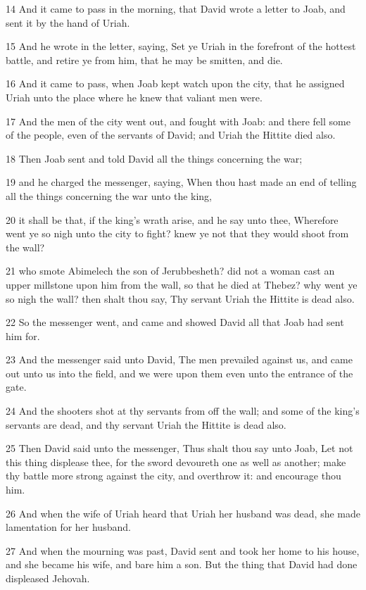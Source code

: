 \par 14 And it came to pass in the morning, that David wrote a letter to Joab, and sent it by the hand of Uriah.
\par 15 And he wrote in the letter, saying, Set ye Uriah in the forefront of the hottest battle, and retire ye from him, that he may be smitten, and die.
\par 16 And it came to pass, when Joab kept watch upon the city, that he assigned Uriah unto the place where he knew that valiant men were.
\par 17 And the men of the city went out, and fought with Joab: and there fell some of the people, even of the servants of David; and Uriah the Hittite died also.
\par 18 Then Joab sent and told David all the things concerning the war;
\par 19 and he charged the messenger, saying, When thou hast made an end of telling all the things concerning the war unto the king,
\par 20 it shall be that, if the king's wrath arise, and he say unto thee, Wherefore went ye so nigh unto the city to fight? knew ye not that they would shoot from the wall?
\par 21 who smote Abimelech the son of Jerubbesheth? did not a woman cast an upper millstone upon him from the wall, so that he died at Thebez? why went ye so nigh the wall? then shalt thou say, Thy servant Uriah the Hittite is dead also.
\par 22 So the messenger went, and came and showed David all that Joab had sent him for.
\par 23 And the messenger said unto David, The men prevailed against us, and came out unto us into the field, and we were upon them even unto the entrance of the gate.
\par 24 And the shooters shot at thy servants from off the wall; and some of the king's servants are dead, and thy servant Uriah the Hittite is dead also.
\par 25 Then David said unto the messenger, Thus shalt thou say unto Joab, Let not this thing displease thee, for the sword devoureth one as well as another; make thy battle more strong against the city, and overthrow it: and encourage thou him.
\par 26 And when the wife of Uriah heard that Uriah her husband was dead, she made lamentation for her husband.
\par 27 And when the mourning was past, David sent and took her home to his house, and she became his wife, and bare him a son. But the thing that David had done displeased Jehovah.

